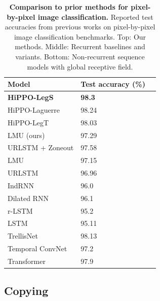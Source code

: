 \documentclass[../hippo.tex]{subfiles}
\begin{document}
\begin{table}[ht]
  \caption{ \textbf{Comparison to prior methods for pixel-by-pixel image classification.} Reported test accuracies from previous works on pixel-by-pixel image classification benchmarks. Top: Our methods. Middle: Recurrent baselines and variants. Bottom: Non-recurrent sequence models with global receptive field.
  }
    \centering
    \begin{tabular}{@{}lll@{}}
      \toprule
      Model                                     & Test accuracy (\%) \\
      \midrule
      \textbf{HiPPO-LegS}                       & \textbf{98.3}      \\
      HiPPO-Laguerre                            & 98.24              \\
      HiPPO-LegT                                & 98.03              \\
      LMU (ours)                                & 97.29              \\
      \midrule
      URLSTM + Zoneout \citep{krueger2016zoneout}          & 97.58              \\
      LMU~\citep{voelker2019legendre}           & 97.15              \\
      URLSTM~\citep{gu2020improving}            & 96.96              \\
      IndRNN~\citep{indrnn}                     & 96.0               \\
      Dilated RNN~\citep{chang2017dilated}      & 96.1               \\
      r-LSTM ~\citep{trinh2018learning}         & 95.2               \\
      LSTM~\citep{gu2020improving}              & 95.11              \\
      \midrule
      TrellisNet~\citep{trellisnet}             & 98.13              \\
      Temporal ConvNet~\citep{bai2018empirical} & 97.2               \\
      Transformer~\citep{trinh2018learning}     & 97.9               \\
      \bottomrule
    \end{tabular}
    \label{tab:pmnist-test}
\end{table}


\subsection{Copying}
\label{sec:copying-details}
\end{document}
